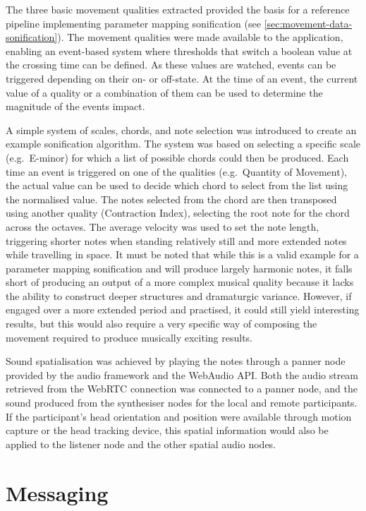 The three basic movement qualities extracted provided the basis for a reference pipeline implementing parameter mapping sonification (see \autoref{sec:movement-data-sonification}).
The movement qualities were made available to the application, enabling an event-based system where thresholds that switch a boolean value at the crossing time can be defined.
As these values are watched, events can be triggered depending on their on- or off-state.
At the time of an event, the current value of a quality or a combination of them can be used to determine the magnitude of the event\textquotesingle s impact.

A simple system of scales, chords, and note selection was introduced to create an example sonification algorithm.
The system was based on selecting a specific scale (e.g.\ E-minor) for which a list of possible chords could then be produced.
Each time an event is triggered on one of the qualities (e.g.\ Quantity of Movement), the actual value can be used to decide which chord to select from the list using the normalised value.
The notes selected from the chord are then transposed using another quality (Contraction Index), selecting the root note for the chord across the octaves.
The average velocity was used to set the note length, triggering shorter notes when standing relatively still and more extended notes while travelling in space.
It must be noted that while this is a valid example for a parameter mapping sonification and will produce largely harmonic notes, it falls short of producing an output of a more complex musical quality because it lacks the ability to construct deeper structures and dramaturgic variance.
However, if engaged over a more extended period and practised, it could still yield interesting results, but this would also require a very specific way of composing the movement required to produce musically exciting results.

Sound spatialisation was achieved by playing the notes through a panner node provided by the audio framework and the WebAudio \ac{API}.
Both the audio stream retrieved from the \ac{WebRTC} connection was connected to a panner node, and the sound produced from the synthesiser nodes for the local and remote participants.
If the participant's head orientation and position were available through motion capture or the head tracking device, this spatial information would also be applied to the listener node and the other spatial audio nodes.

\section{Messaging}
\label{sec:messaging}


